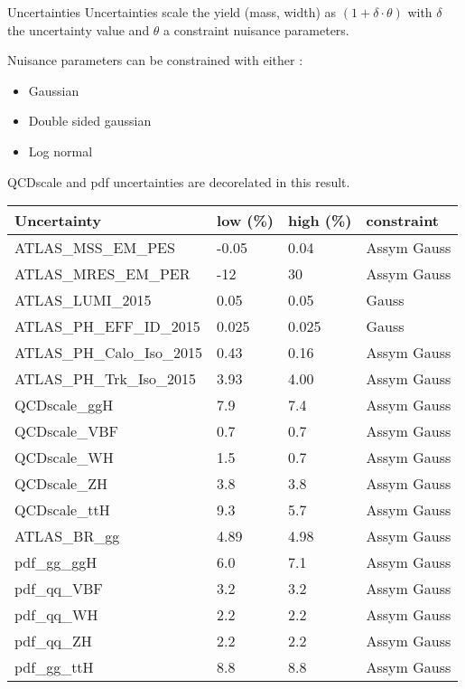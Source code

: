 \documentclass[a4paper]{beamer}
\begin{document}
\begin{frame}{Uncertainties}
Uncertainties scale the yield (mass, width) as $(1+\delta\cdot\theta)$ with $\delta$ the uncertainty value and $\theta$ a constraint nuisance parameters.
\vfill
\begin{minipage}{0.49\linewidth}
Nuisance parameters can be constrained with either :
\begin{itemize}
\item Gaussian
\item Double sided gaussian
\item Log normal
\end{itemize}
\vfill
QCDscale and pdf uncertainties are decorelated in this result.
\end{minipage}
\hfill
\begin{minipage}{0.49\linewidth}
\begin{center}
\resizebox{\linewidth}{!} {
\begin{tabular}{llll}
  \hline
  Uncertainty & low (\%)& high (\%) & constraint \\
  \hline
  ATLAS\_MSS\_EM\_PES & -0.05 & 0.04 & Assym Gauss \\
  ATLAS\_MRES\_EM\_PER & -12 & 30 & Assym Gauss \\
  ATLAS\_LUMI\_2015 & 0.05 & 0.05 & Gauss \\
  ATLAS\_PH\_EFF\_ID\_2015 & 0.025 & 0.025 & Gauss \\
  ATLAS\_PH\_Calo\_Iso\_2015 & 0.43 & 0.16 & Assym Gauss \\
  ATLAS\_PH\_Trk\_Iso\_2015 & 3.93 & 4.00  & Assym Gauss \\
  QCDscale\_ggH & 7.9 & 7.4 & Assym Gauss \\
  QCDscale\_VBF & 0.7 & 0.7 & Assym Gauss \\
  QCDscale\_WH & 1.5 & 0.7 & Assym Gauss \\
  QCDscale\_ZH & 3.8 & 3.8 & Assym Gauss \\
  QCDscale\_ttH & 9.3 & 5.7 & Assym Gauss \\
  ATLAS\_BR\_gg & 4.89 & 4.98 & Assym Gauss \\
  pdf\_gg\_ggH & 6.0 & 7.1 & Assym Gauss \\
  pdf\_qq\_VBF & 3.2 & 3.2 & Assym Gauss \\
  pdf\_qq\_WH & 2.2 & 2.2 & Assym Gauss \\
  pdf\_qq\_ZH & 2.2 & 2.2 & Assym Gauss \\
  pdf\_gg\_ttH & 8.8 & 8.8 & Assym Gauss \\
  \hline
  \end{tabular}
}
\end{center}
\end{minipage}
\end{frame}
\end{document}
